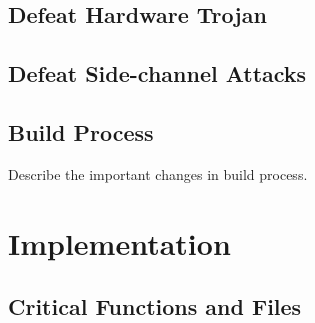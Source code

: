 \documentclass[11pt,oneside,onecolumn,letterpaper]{article}
\begin{document}
\subsection{Defeat Hardware Trojan}

\subsection{Defeat Side-channel Attacks}

\subsection{Build Process}

  Describe the important changes in build process.

\section{Implementation}
\subsection{Critical Functions and Files}



\end{document}
